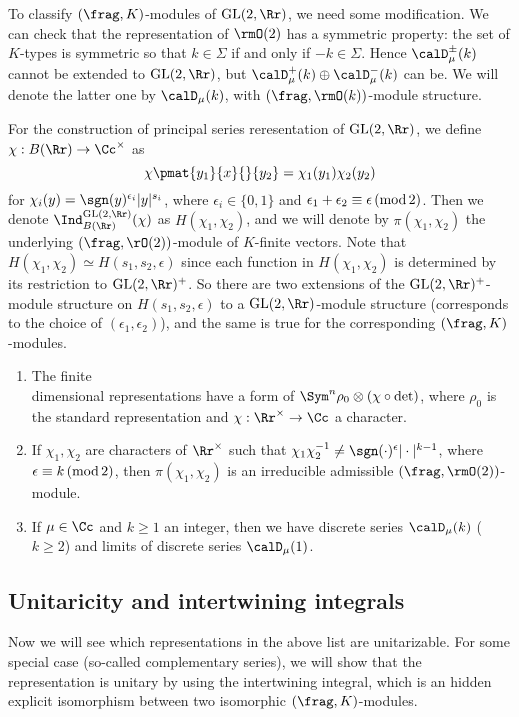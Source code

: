 To classify $(\frag, K)$-modules of $\GL(2, \Rr)$, we need some modification. We can check that the representation of $\rmO(2)$ has a symmetric property: the set of $K$-types is symmetric so that $k\in\Sigma$ if and only if $-k\in \Sigma$. Hence $\calD_{\mu}^{\pm}(k)$ cannot be extended to $\GL(2, \Rr)$, but $\calD_{\mu}^{+}(k)\oplus \calD_{\mu}^{-}(k)$ can be. We will denote the latter one by $\calD_{\mu}(k)$, with $(\frag, \rmO(k))$-module structure. 

For the construction of principal series reresentation of $\GL(2, \Rr)$, we define $\chi: B(\Rr)\to \Cc^{\times}$ as 
$$
\chi\pmat{y_{1}}{x}{}{y_{2}} = \chi_{1}(y_{1})\chi_{2}(y_{2})
$$
for $\chi_{i}(y) = \sgn(y)^{\epsilon_{i}}|y|^{s_{i}}$, where $\epsilon_{i} \in \{0, 1\}$ and $\epsilon_1 + \epsilon_2 \equiv \epsilon \,(\mathrm{mod}\,2)$. 
Then we denote $\Ind_{B(\Rr)}^{\GL(2, \Rr)} (\chi)$ as $H(\chi_1, \chi_2)$, and we will denote by $\pi(\chi_1, \chi_2)$ the underlying $(\frag, \rO(2))$-module of $K$-finite vectors. 
Note that $H(\chi_1, \chi_2) \simeq H(s_1, s_2, \epsilon)$ since each function in $H(\chi_1, \chi_2)$ is determined by its restriction to $\GL(2, \Rr)^{+}$. 
So there are two extensions of the $\GL(2, \Rr)^{+}$-module structure on $H(s_1, s_2, \epsilon)$ to a $\GL(2, \Rr)$-module structure (corresponds to the choice of $(\epsilon_1, \epsilon_2)$), and the same is true for the corresponding $(\frag, K)$-modules. 
\begin{theorem}
\begin{enumerate}
\item The finite \\dimensional representations have a form of $\Sym^{n}\rho_{0} \otimes (\chi\circ \det)$, where $\rho_{0}$ is the standard representation and $\chi:\Rr^{\times}\to \Cc$ a character. 
\item If $\chi_{1}, \chi_{2}$ are characters of $\Rr^{\times}$ such that $\chi_{1}\chi_{2}^{-1} \neq \sgn(\cdot)^{\epsilon}|\cdot|^{k-1}$, where $\epsilon\equiv k\,(\mathrm{mod}\,2)$, then $\pi(\chi_{1}, \chi_{2})$ is an irreducible admissible $(\frag, \rmO(2))$-module.
\item If $\mu \in \Cc$  and $k\geq 1$ an integer, then we have discrete series $\calD_{\mu}(k)$ ($k\geq 2$) and limits of discrete series $\calD_{\mu}(1)$. 
\end{enumerate}
\end{theorem}

\subsection{Unitaricity and intertwining integrals}
Now we will see which representations in the above list are unitarizable. For some special case (so-called complementary series), we will show that the representation is unitary by using the intertwining integral, which is an hidden explicit isomorphism between two isomorphic $(\frag, K)$-modules. 


